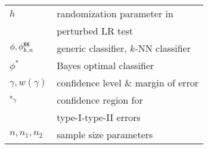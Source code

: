 \begin{table}[ht]
\begin{tabular}{ll}
 \(  h\) & randomization parameter in \\
 & perturbed LR test \\
\( \phi, \phi^{\mathtt{NN}}_{k, n} \) & generic classifier, $k$-NN classifier \\
\( \phi^* \) & Bayes optimal classifier \\
\( \gamma, w(\gamma) \) & confidence level \& 
margin of error\\
$\square_\gamma$ & confidence region for \\
 & type-I-type-II errors\\
 $n, n_1, n_2$ & sample size parameters \\
\bottomrule
\end{tabular}
\end{table}




